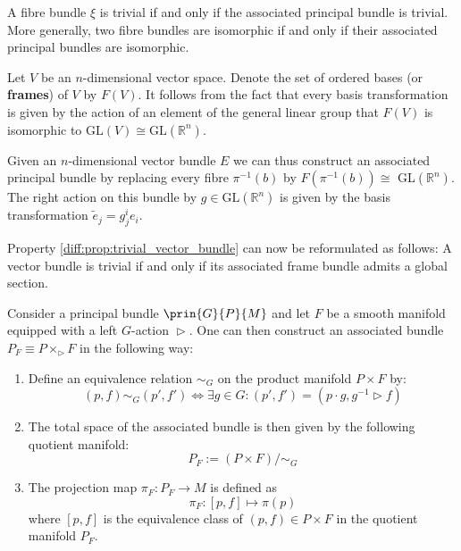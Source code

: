 	\begin{property}
		A fibre bundle $\xi$ is trivial if and only if the associated principal bundle is trivial. More generally, two fibre bundles are isomorphic if and only if their associated principal bundles are isomorphic.
	\end{property}
	
	\begin{example}\label{bundles:frame_bundle}
		Let $V$ be an $n$-dimensional vector space. Denote the set of ordered bases (or \textbf{frames}) of $V$ by $F(V)$. It follows from the fact that every basis transformation is given by the action of an element of the general linear group that $F(V)$ is isomorphic to $\text{GL}(V)\cong\text{GL}(\mathbb{R}^n)$.
		
		Given an $n$-dimensional vector bundle $E$ we can thus construct an associated principal bundle by replacing every fibre $\pi^{-1}(b)$ by $F(\pi^{-1}(b))\cong$ GL$(\mathbb{R}^n)$. The right action on this bundle by $g\in\text{GL}(\mathbb{R}^n)$ is given by the basis transformation $\widetilde{e}_j = g^i_je_i$.
	\end{example}
	\begin{property}\label{diff:prop:trivial_vector_bundle_frames}
		Property \ref{diff:prop:trivial_vector_bundle} can now be reformulated as follows: A vector bundle is trivial if and only if its associated frame bundle admits a global section.
	\end{property}
	
	\begin{construct}
		Consider a principal bundle $\prin{G}{P}{M}$ and let $F$ be a smooth manifold equipped with a left $G$-action $\vartriangleright$. One can then construct an associated bundle $P_F \equiv P \times_\vartriangleright F$ in the following way:
		\begin{enumerate}
			\item Define an equivalence relation $\sim_G$ on the product manifold $P\times F$ by:
			\begin{equation}
				\label{diff:prin:associated_bundle_equivalence}
				(p, f)\sim_G (p', f')\iff \exists g\in G: (p', f') = (p\cdot g, g^{-1}\vartriangleright f)
			\end{equation}
			\item The total space of the associated bundle is then given by the following quotient manifold:
			\begin{equation}
				P_F := (P\times F)/\sim_G
			\end{equation}
			\item The projection map $\pi_F:P_F\rightarrow M$ is defined as
			\begin{equation}
				\pi_F:[p, f]\mapsto \pi(p)
			\end{equation}
			where $[p, f]$ is the equivalence class of $(p, f)\in P\times F$ in the quotient manifold $P_F$.
		\end{enumerate}
	\end{construct}
	
